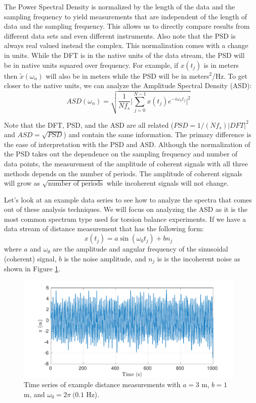 \documentclass{book}
\begin{document}
The Power Spectral Density is normalized by the length of the data and the sampling frequency to yield measurements that are independent of the length of data and the sampling frequency. This allows us to directly compare results from different data sets and even different instruments. Also note that the PSD is always real valued instead the complex. This normalization comes with a change in units. While the DFT is in the native units of the data stream, the PSD will be in native units squared over frequency. For example, if $x(t_j)$ is in meters then $\tilde x (\omega_n)$ will also be in meters while the PSD will be in meters$^2$/Hz. To get closer to the native units, we can analyze the Amplitude Spectral Density (ASD):
\begin{equation}
ASD (\omega_n) = \sqrt{\frac{1}{N f_s} \bigg| \sum_{j=0}^{N-1} x(t_j) e^{-i \omega_n t_j} \bigg|^2} \label{PSD}
\end{equation}

Note that the DFT, PSD, and the ASD are all related ($PSD = 1/(Nf_s) |DFT|^2$ and $ASD = \sqrt{PSD}$) and contain the same information. The primary difference is the ease of interpretation with the PSD and ASD. Although the normalization of the PSD takes out the dependence on the sampling frequency and number of data points, the measurement of the amplitude of coherent signals with all three methods depends on the number of periods. The amplitude of coherent signals will grow as $\sqrt{\text{number of periods}}$ while incoherent signals will not change.

Let's look at an example data series to see how to analyze the spectra that comes out of these analysis techniques. We will focus on analyzing the ASD as it is the most common spectrum type used for torsion balance experiments. If we have a data stream of distance measurement that has the following form:
\begin{equation}
x(t_j) = a \sin(\omega_0 t_j) + b n_j
\end{equation}
where $a$ and $\omega_0$ are the amplitude and angular frequency of the sinusoidal (coherent) signal, $b$ is the noise amplitude, and $n_j$ is is the incoherent noise as shown in Figure \ref{SpecTime}. 

\begin{figure}[!h]
\begin{centering}
\includegraphics[width=\textwidth]{SpecTime.pdf}
\caption{Time series of example distance measurements with $a=3$ m, $b=1$ m, and $\omega_0=2\pi\ (0.1$ Hz).}\label{SpecTime}
\end{centering}
\end{figure}
\end{document}

